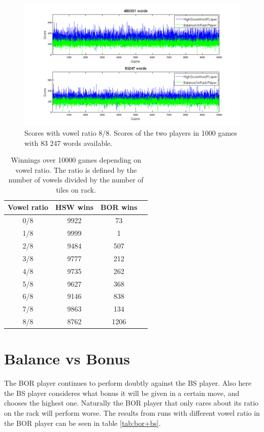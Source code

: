 \documentclass[a4paper, 12pt]{report}
\begin{document}
\graphicspath{{../results/Plots/}}

\begin{figure}[h]
\centering
\includegraphics[scale=0.45]{HighBalance8vow_bothDict}
\caption {Scores with vowel ratio 8/8. Scores of the two players in 1000 games with 83 247 words available.}
\label{fig:bonusBalanceSmallDict}
\end{figure}

\begin{table}[h]
\centering
    \begin{tabular}{ c | c | c p{5cm}}
   	Vowel ratio & HSW wins & BOR wins \\ \hline
	0/8 & 9922 & 73 \\ 
    	1/8 & 9999  & 1 \\ 
    	2/8 & 9484 & 507 \\
    	3/8 & 9777 & 212 \\
	4/8 & 9735 & 262 \\ 
	5/8 & 9627 & 368 \\ 
	6/8 & 9146 & 838 \\ 
	7/8 & 9863 & 134 \\ 
	8/8 & 8762 & 1206 \\
    \end{tabular}
\caption{Winnings over 10000 games depending on vowel ratio. The ratio is defined by the number of vowels divided by the number of tiles on rack.}
\label{tab:bor+hsw}
\end{table}


\section{Balance vs Bonus}
\label{sec:balanceBonus}
The BOR player continues to perform doubtly against the BS player. Also here the BS player consideres what bonus it will be given in a certain move, and chooses the highest one. Naturally the BOR player that only cares about its ratio on the rack will perform worse. The results from runs with different vowel ratio in the BOR player can be seen in table \ref{tab:bor+bs}.
\end{document}
